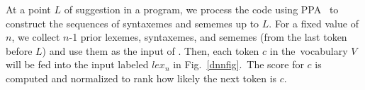 
\vspace{0.02in}
 At a point $L$ of suggestion in a program,
we process the code using PPA~\cite{ppa08} to construct the sequences
of syntaxemes and sememes up to $L$. For a fixed value of $n$, we
collect $n$-1 prior lexemes, syntaxemes, and sememes (from the last
token before $L$) and use them as the input of {\tool}. Then, each
token $c$ in the~vocabulary $V$ will be fed into the input labeled
$lex_n$ in Fig.~\ref{dnnfig}.~The score for $c$ is
computed and normalized to rank how likely the next token is $c$.



